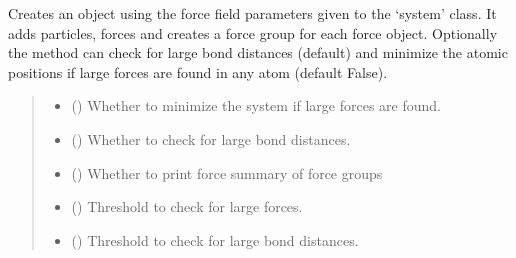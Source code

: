\documentclass[letterpaper,10pt,english]{sphinxmanual}
\begin{document}
\begin{fulllineitems}
\begin{fulllineitems}
\sphinxAtStartPar
Creates an  object using the force field parameters
given to the ‘system’ class. It adds particles, forces and
creates a force group for each force object. Optionally the method
can check for large bond distances (default) and minimize the atomic
positions if large forces are found in any atom (default False).
\begin{quote}\begin{description}
\begin{itemize}
\item {} 
\sphinxAtStartPar
{} (\sphinxstyleliteralemphasis{\sphinxupquote{ (}}\sphinxstyleliteralemphasis{\sphinxupquote{)}}) \textendash{} Whether to minimize the system if large forces are found.

\item {} 
\sphinxAtStartPar
{} (\sphinxstyleliteralemphasis{\sphinxupquote{ (}}\sphinxstyleliteralemphasis{\sphinxupquote{)}}) \textendash{} Whether to check for large bond distances.

\item {} 
\sphinxAtStartPar
{} (\sphinxstyleliteralemphasis{\sphinxupquote{ (}}\sphinxstyleliteralemphasis{\sphinxupquote{)}}) \textendash{} Whether to print force summary of force groups

\item {} 
\sphinxAtStartPar
{} (\sphinxstyleliteralemphasis{\sphinxupquote{ (}}\sphinxstyleliteralemphasis{\sphinxupquote{)}}) \textendash{} Threshold to check for large forces.

\item {} 
\sphinxAtStartPar
{} (\sphinxstyleliteralemphasis{\sphinxupquote{ (}}\sphinxstyleliteralemphasis{\sphinxupquote{)}}) \textendash{} Threshold to check for large bond distances.


\end{itemize}
\end{description}
\end{quote}
\end{fulllineitems}
\end{fulllineitems}
\end{document}

